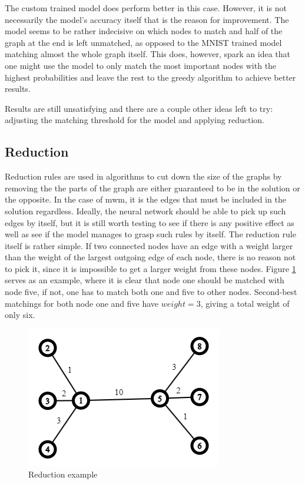 The custom trained model does perform better in this case. However, it is not necessarily the model's accuracy itself that is the reason for improvement. The model seems to be rather indecisive on which nodes to match and half of the graph at the end is left unmatched, as opposed to the MNIST trained model matching almost the whole graph itself. This does, however, spark an idea that one might use the model to only match the most important nodes with the highest probabilities and leave the rest to the greedy algorithm to achieve better results. 

Results are still unsatisfying and there are a couple other ideas left to try: adjusting the matching threshold for the model and applying reduction.

\subsection{Reduction}

Reduction rules are used in algorithms to cut down the size of the graphs by removing the the parts of the graph are either guaranteed to be in the solution or the opposite. In the case of \gls{mwm}, it is the edges that must be included in the solution regardless. Ideally, the neural network should be able to pick up such edges by itself, but it is still worth testing to see if there is any positive effect as well as see if the model manages to grasp such rules by itself. The reduction rule itself is rather simple. If two connected nodes have an edge with a weight larger than the weight of the largest outgoing edge of each node, there is no reason not to pick it, since it is impossible to get a larger weight from these nodes. Figure \ref{Reduction example} serves as an example, where it is clear that node one should be matched with node five, if not, one has to match both one and five to other nodes. Second-best matchings for both node one and five have $weight = 3$, giving a total weight of only six.

\begin{figure}[H]
    \centering
    \includegraphics[scale=1.0]{figures/ReductionExample}
    \caption{Reduction example}
    \label{Reduction example}
\end{figure}

